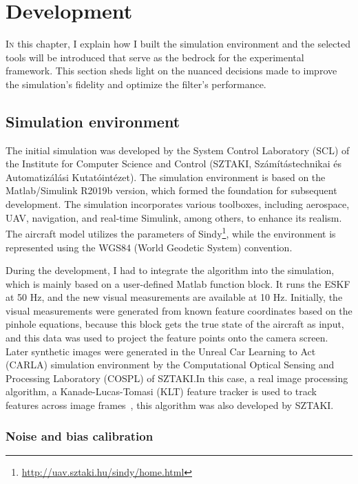 \chapter{Development}\label{chap:dev}

\lettrine{I}{n} this chapter, I explain how I built the simulation environment and the selected tools will be introduced that serve as the bedrock for the experimental framework. This section sheds light on the nuanced decisions made to improve the simulation's fidelity and optimize the filter's performance. 

\section{Simulation environment}

The initial simulation was developed by the System Control Laboratory (SCL) of the Institute for Computer Science and Control (SZTAKI, Számítástechnikai és Automatizálási Kutatóintézet). The simulation environment is based on the Matlab/Simulink R2019b version, which formed the foundation for subsequent development. The simulation incorporates various toolboxes, including aerospace, UAV, navigation, and real-time Simulink, among others, to enhance its realism. The aircraft model utilizes the parameters of Sindy\footnote{\url{http://uav.sztaki.hu/sindy/home.html}}, while the environment is represented using the WGS84 (World Geodetic System) convention.

During the development, I had to integrate the algorithm into the simulation, which is mainly based on a user-defined Matlab function block. It runs the ESKF at 50 \si{\hertz}, and the new visual measurements are available at 10 \si{\hertz}. Initially, the visual measurements were generated from known feature coordinates based on the pinhole equations, because this block gets the true state of the aircraft as input, and this data was used to project the feature points onto the camera screen. Later synthetic images were generated in the Unreal Car Learning to Act (CARLA) simulation environment by the Computational Optical Sensing and Processing Laboratory (COSPL) of SZTAKI.\@ In this case, a real image processing algorithm, a Kanade-Lucas-Tomasi (KLT) feature tracker is used to track features across image frames~\cite{KLT}, this algorithm was also developed by SZTAKI.\@ 

\subsection{Noise and bias calibration}

